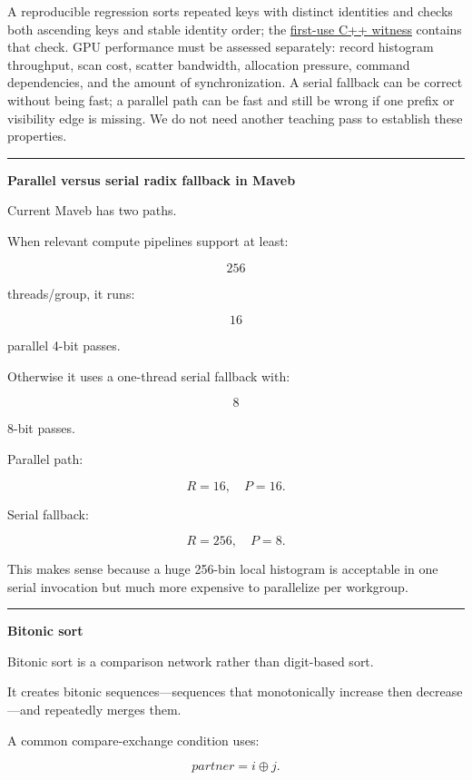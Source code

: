 A reproducible regression sorts repeated keys with distinct identities and checks both ascending keys and stable identity order; the \href{../../tools/labs/first_use_contract_lab.cpp}{first-use C++ witness} contains that check. GPU performance must be assessed separately: record histogram throughput, scan cost, scatter bandwidth, allocation pressure, command dependencies, and the amount of synchronization. A serial fallback can be correct without being fast; a parallel path can be fast and still be wrong if one prefix or visibility edge is missing. We do not need another teaching pass to establish these properties.

\begin{center}\rule{0.5\linewidth}{0.5pt}\end{center}

\textbf{Parallel versus serial radix fallback in Maveb}

Current Maveb has two paths.

When relevant compute pipelines support at least:

\[
256
\]

threads/group, it runs:

\[
16
\]

parallel 4-bit passes.

Otherwise it uses a one-thread serial fallback with:

\[
8
\]

8-bit passes.

Parallel path:

\[
R=16,
\quad
P=16.
\]

Serial fallback:

\[
R=256,
\quad
P=8.
\]

This makes sense because a huge 256-bin local histogram is acceptable in one serial invocation but much more expensive to parallelize per workgroup.

\begin{center}\rule{0.5\linewidth}{0.5pt}\end{center}

\textbf{Bitonic sort}

Bitonic sort is a comparison network rather than digit-based sort.

It creates bitonic sequences---sequences that monotonically increase then decrease---and repeatedly merges them.

A common compare-exchange condition uses:

\[
partner=i\oplus j.
\]

